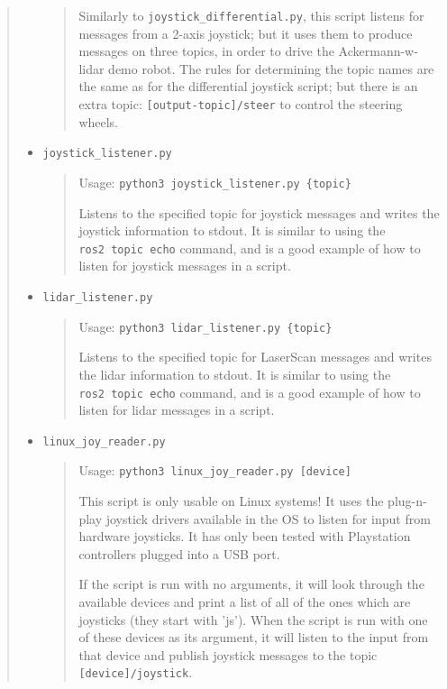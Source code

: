 \begin{quote}
\begin{itemize}
\begin{quote}
  Similarly to \texttt{joystick\_differential.py}, this script listens
  for messages from a 2-axis joystick; but it uses them to produce
  messages on three topics, in order to drive the Ackermann-w-lidar demo
  robot. The rules for determining the topic names are the same as for
  the differential joystick script; but there is an extra topic:
  \texttt{{[}output-topic{]}/steer} to control the steering wheels.
  \end{quote}
\item
  \texttt{joystick\_listener.py}

  \begin{quote}
  Usage: \texttt{python3\ joystick\_listener.py\ \{topic\}}

  Listens to the specified topic for joystick messages and writes the
  joystick information to stdout. It is similar to using the
  \texttt{ros2\ topic\ echo} command, and is a good example of how to
  listen for joystick messages in a script.
  \end{quote}
\item
  \texttt{lidar\_listener.py}

  \begin{quote}
  Usage: \texttt{python3\ lidar\_listener.py\ \{topic\}}

  Listens to the specified topic for LaserScan messages and writes the
  lidar information to stdout. It is similar to using the
  \texttt{ros2\ topic\ echo} command, and is a good example of how to
  listen for lidar messages in a script.
  \end{quote}
\item
  \texttt{linux\_joy\_reader.py}

  \begin{quote}
  Usage: \texttt{python3\ linux\_joy\_reader.py\ {[}device{]}}

  This script is only usable on Linux systems! It uses the plug-n-play
  joystick drivers available in the OS to listen for input from hardware
  joysticks. It has only been tested with Playstation controllers
  plugged into a USB port.

  If the script is run with no arguments, it will look through the
  available devices and print a list of all of the ones which are
  joysticks (they start with 'js'). When the script is run with one of
  these devices as its argument, it will listen to the input from that
  device and publish joystick messages to the topic
  \texttt{{[}device{]}/joystick}.
  \end{quote}
\end{itemize}
\end{quote}

